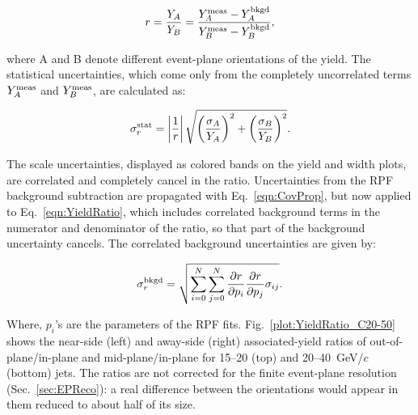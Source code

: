 \begin{equation}
	r = \frac{Y_A}{Y_B} = \frac{Y_A^{\rm meas} - Y_A^{\rm bkgd}}{Y_B^{\rm meas} - Y_B^{\rm bkgd}},
	\label{eqn:YieldRatio}
\end{equation}

\noindent where A and B denote different event-plane orientations of the yield.  The statistical uncertainties, which come only from the completely uncorrelated terms $Y_A^{\rm meas}$ and $Y_B^{\rm meas}$, are calculated as: 

\begin{equation}
	\sigma^{\rm stat}_r = \left|\frac{1}{r}\right|\sqrt{\left(\frac{\sigma_A}{Y_A}\right)^2 + \left(\frac{\sigma_B}{Y_B}\right)^2}.
	\label{eqn:StatRatio}
\end{equation}

\noindent The scale uncertainties, displayed as colored bands on the yield and width plots, are correlated and completely cancel in the ratio.  Uncertainties from the RPF background subtraction are propagated with Eq.~\ref{eqn:CovProp}, but now applied to Eq.~\ref{eqn:YieldRatio}, which includes correlated background terms in the numerator and denominator of the ratio, so that part of the background uncertainty cancels.  The correlated background uncertainties are given by:

\begin{equation}
	\sigma^{\rm bkgd}_r = \sqrt{\sum_{i=0}^{N} \sum_{j=0}^{N} \frac{\partial r}{\partial p_i} \frac{\partial r}{\partial p_j} \sigma_{ij}}.
	\label{eqn:SysRatio}
\end{equation}

Where, $p_i$'s are the parameters of the RPF fits. Fig.~\ref{plot:YieldRatio_C20-50} shows the near-side (left) and away-side (right) associated-yield ratios of out-of-plane/in-plane and mid-plane/in-plane for 15--20 (top) and 20--40~GeV/\(c\) (bottom) jets.
%
The ratios are not corrected for the finite event-plane resolution (Sec.~\ref{sec:EPReco}): a real difference between the orientations would appear in them reduced to about half of its size.

